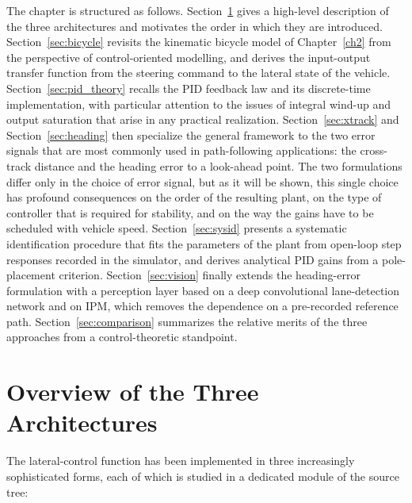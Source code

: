 The chapter is structured as follows. Section~\ref{sec:lka_overview} gives a high-level description of the three architectures and motivates the order in which they are introduced. Section~\ref{sec:bicycle} revisits the kinematic bicycle model of Chapter~\ref{ch2} from the perspective of control-oriented modelling, and derives the input-output transfer function from the steering command to the lateral state of the vehicle. Section~\ref{sec:pid_theory} recalls the PID feedback law and its discrete-time implementation, with particular attention to the issues of integral wind-up and output saturation that arise in any practical realization. Section~\ref{sec:xtrack} and Section~\ref{sec:heading} then specialize the general framework to the two error signals that are most commonly used in path-following applications: the cross-track distance and the heading error to a look-ahead point. The two formulations differ only in the choice of error signal, but as it will be shown, this single choice has profound consequences on the order of the resulting plant, on the type of controller that is required for stability, and on the way the gains have to be scheduled with vehicle speed. Section~\ref{sec:sysid} presents a systematic identification procedure that fits the parameters of the plant from open-loop step responses recorded in the simulator, and derives analytical PID gains from a pole-placement criterion. Section~\ref{sec:vision} finally extends the heading-error formulation with a perception layer based on a deep convolutional lane-detection network and on \acs{IPM}, which removes the dependence on a pre-recorded reference path. Section~\ref{sec:comparison} summarizes the relative merits of the three approaches from a control-theoretic standpoint.

\section{Overview of the Three Architectures}
\label{sec:lka_overview}
The lateral-control function has been implemented in three increasingly sophisticated forms, each of which is studied in a dedicated module of the source tree:


